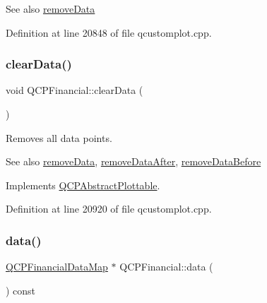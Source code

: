 \begin{DoxySeeAlso}{See also}
\hyperlink{class_q_c_p_financial_a048c741d3c8cc5709c2c44b759fdf27c}{remove\+Data} 
\end{DoxySeeAlso}


Definition at line 20848 of file qcustomplot.\+cpp.

\mbox{\label{class_q_c_p_financial_a11fd49928c33e55e27b7319c6927864a}} 
\subsubsection{\texorpdfstring{clear\+Data()}{clearData()}}
{\footnotesize\ttfamily void Q\+C\+P\+Financial\+::clear\+Data (\begin{DoxyParamCaption}{ }\end{DoxyParamCaption})\hspace{0.3cm}{\ttfamily [virtual]}}

Removes all data points.

\begin{DoxySeeAlso}{See also}
\hyperlink{class_q_c_p_financial_a048c741d3c8cc5709c2c44b759fdf27c}{remove\+Data}, \hyperlink{class_q_c_p_financial_aa0fcd357005288c833a230c7874825ba}{remove\+Data\+After}, \hyperlink{class_q_c_p_financial_a097c0383c7c1e9042ca7f93cb439d15a}{remove\+Data\+Before} 
\end{DoxySeeAlso}


Implements \hyperlink{class_q_c_p_abstract_plottable_a86e5b8fd4b6ff4f4084e7ea4c573fc53}{Q\+C\+P\+Abstract\+Plottable}.



Definition at line 20920 of file qcustomplot.\+cpp.

\mbox{\label{class_q_c_p_financial_a528c81578e4f25999a9169127763cfd4}} 
\subsubsection{\texorpdfstring{data()}{data()}}
{\footnotesize\ttfamily \hyperlink{qcustomplot_8h_a745c09823fae0974b50beca9bc3b3d7d}{Q\+C\+P\+Financial\+Data\+Map} $\ast$ Q\+C\+P\+Financial\+::data (\begin{DoxyParamCaption}{ }\end{DoxyParamCaption}) const\hspace{0.3cm}{\ttfamily [inline]}}


